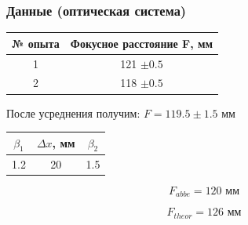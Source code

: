\documentclass[10pt,pdf,hyperref={unicode}]{beamer}
\begin{document}
\begin{frame}
\frametitle{Данные (оптическая система)} 



\begin{center}
	\begin{tabular}{|c|c|}
		\hline
		№ опыта & Фокусное расстояние F, мм\\
		\hline
		1 & 121 $\pm 0.5$  \\
		\hline
		2 & 118 $ \pm 0.5$ \\
		\hline
	\end{tabular}
\end{center}

После усреднения получим:
$F = 119.5\pm 1.5$ мм


\begin{center}
	\begin{tabular}{|c|c|c|}
		\hline
		$\beta_1$ & $\Delta x$, мм & $\beta_2$ \\
		\hline
		1.2 & 20 & 1.5 \\
		\hline
	\end{tabular}
\end{center}


\begin{equation*}
	F_{abbe} = 120 \text{ мм}
\end{equation*}


\begin{equation*}
	F_{theor} = 126 \text{ мм}
\end{equation*}
\end{frame}
\end{document}
